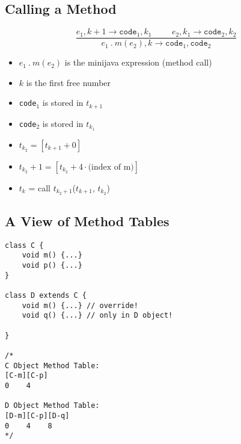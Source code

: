 \documentclass[10pt]{article}
\begin{document}
\subsection*{Calling a Method}
\[\frac{e_1, k + 1 \rightarrow \texttt{code}_1, k_1 \hspace{1cm} e_2, k_1 \rightarrow \texttt{code}_2, k_2}{e_1 \:.\: m(e_2), k \rightarrow \texttt{code}_1, \texttt{code}_2}\]
\begin{itemize}
    \item $e_1 \:.\: m(e_2)$ is the minijava expression (method call)
    \item $k$ is the first free number
    \item \texttt{code}$_1$ is stored in $t_{k + 1}$
    \item \texttt{code}$_2$ is stored in $t_{k_1}$
    \item $t_{k_2} = [t_{k + 1} + 0]$
    \item $t_{k_2} + 1 = [t_{k_2} + 4 \cdot \text{(index of m)}]$
    \item $t_k$ = call $t_{k_2 + 1}$($t_{k + 1}$, $t_{k_2}$)
\end{itemize}
\subsection*{A View of Method Tables}
\begin{verbatim}
class C {
    void m() {...} 
    void p() {...}
}

class D extends C {
    void m() {...} // override!
    void q() {...} // only in D object!

}

/*
C Object Method Table:
[C-m][C-p]
0    4

D Object Method Table:
[D-m][C-p][D-q]
0    4    8
*/
\end{verbatim}
\end{document}
